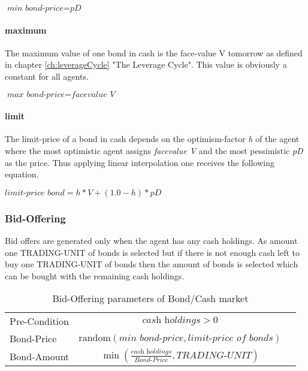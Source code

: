 \documentclass[Bachelorarbeit.tex]{subfiles}
\begin{document}
\begin{center}
$\textit{min bond-price} = \textit{pD}$
\end{center}
 
\paragraph{maximum}
The maximum value of one bond in cash is the face-value V tomorrow as defined in chapter \ref{ch:leverageCycle} "The Leverage Cycle". This value is obviously a constant for all agents.

\begin{center}
$\textit{max bond-price} = \textit{facevalue V}$
\end{center}

\paragraph{limit}
The limit-price of a bond in cash depends on the optimism-factor \textit{h} of the agent where the most optimistic agent assigns \textit{facevalue V} and the most pessimistic \textit{pD} as the price. Thus applying linear interpolation one receives the following equation.

\begin{center}
$\textit{limit-price bond} = h * V + ( 1.0 - h ) * pD$
\end{center}

\subsubsection{Bid-Offering}
Bid offers are generated only when the agent has any cash holdings. As amount one TRADING-UNIT of bonds is selected but if there is not enough cash left to buy one TRADING-UNIT of bonds then the amount of bonds is selected which can be bought with the remaining cash holdings.

\begin{table}[H]
	\centering
	\caption{Bid-Offering parameters of Bond/Cash market}
	\begin{tabular} { l c r }
		\hline
		Pre-Condition & $\textit{cash holdings} > 0$  \\
		Bond-Price & $\mathrm{random}(\textit{min bond-price}, \textit{limit-price of bonds})$ \\
		Bond-Amount & $\min (\frac{\textit{cash holdings} }{ \textit{Bond-Price} }, \textit{TRADING-UNIT} )$ \\
		\hline
	\end{tabular}
\end{table}
\end{document}

